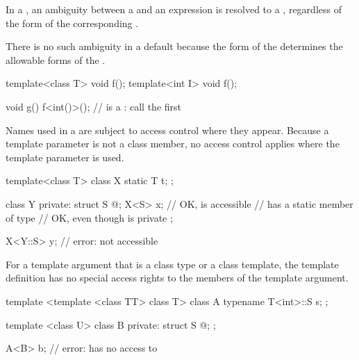 \pnum
In a
,
an ambiguity between a
and an expression is resolved to a
,
regardless of the form of the corresponding
.
\begin{footnote}
There is no such ambiguity in a default
because the form of the
determines the allowable forms of the
.
\end{footnote}
\begin{example}
\begin{codeblock}
template<class T> void f();
template<int I> void f();

void g() {
  f<int()>();       //  is a : call the first 
}
\end{codeblock}
\end{example}

\pnum
\begin{note}
Names used in a 
are subject to access control where they appear.
Because a template parameter is not a class member,
no access control applies where the template parameter is used.
\end{note}
\begin{example}
\begin{codeblock}
template<class T> class X {
  static T t;
};

class Y {
private:
  struct S { @\commentellip@ };
  X<S> x;           // OK,  is accessible
                    //  has a static member of type 
                    // OK, even though  is private
};

X<Y::S> y;          // error:  not accessible
\end{codeblock}
\end{example}
For a template argument that is a class type or a class template,
the template definition has no special access rights
to the members of the template argument.
\begin{example}
\begin{codeblock}
template <template <class TT> class T> class A {
  typename T<int>::S s;
};

template <class U> class B {
private:
  struct S { @\commentellip@ };
};

A<B> b;             // error:  has no access to 
\end{codeblock}
\end{example}

